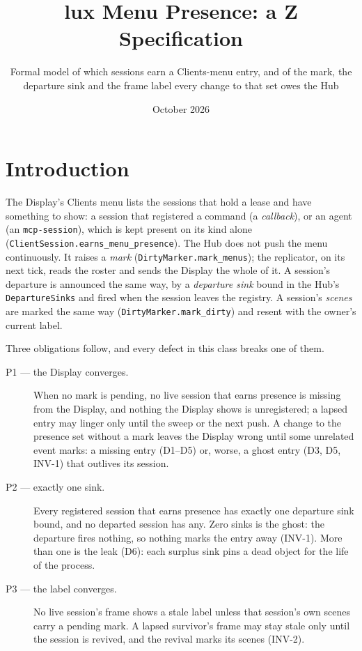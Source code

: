 \documentclass[a4paper,10pt,fleqn]{article}
\begin{document}
\title{lux Menu Presence: a Z Specification}
\author{Formal model of which sessions earn a Clients-menu entry, and of the
  mark, the departure sink and the frame label every change to that set owes
  the Hub}
\date{October 2026}
\maketitle

\section{Introduction}

The Display's Clients menu lists the sessions that hold a lease and have
something to show: a session that registered a command (a \emph{callback}), or
an agent (an \texttt{mcp-session}), which is kept present on its kind alone
(\texttt{ClientSession.earns\_menu\_presence}). The Hub does not push the menu
continuously. It raises a \emph{mark} (\texttt{DirtyMarker.mark\_menus}); the
replicator, on its next tick, reads the roster and sends the Display the
whole of it. A session's departure is announced the same way, by a
\emph{departure sink} bound in the Hub's \texttt{DepartureSinks} and fired
when the session leaves the registry. A session's \emph{scenes} are marked the
same way (\texttt{DirtyMarker.mark\_dirty}) and resent with the owner's
current label.

Three obligations follow, and every defect in this class breaks one of them.

\begin{description}
  \item[P1 --- the Display converges.] When no mark is pending, no live
    session that earns presence is missing from the Display, and nothing the
    Display shows is unregistered; a lapsed entry may linger only until the
    sweep or the next push. A change to the presence set without a mark leaves
    the Display wrong until some unrelated event marks: a missing entry
    (D1--D5) or, worse, a ghost entry (D3, D5, INV-1) that outlives its
    session.
  \item[P2 --- exactly one sink.] Every registered session that earns
    presence has exactly one departure sink bound, and no departed session
    has any. Zero sinks is the ghost: the departure fires nothing, so
    nothing marks the entry away (INV-1). More than one is the leak (D6): each
    surplus sink pins a dead object for the life of the process.
  \item[P3 --- the label converges.] No live session's frame shows a stale
    label unless that session's own scenes carry a pending mark. A lapsed survivor's frame may stay
    stale only until the session is revived, and the revival marks its scenes
    (INV-2).
\end{description}
\end{document}
